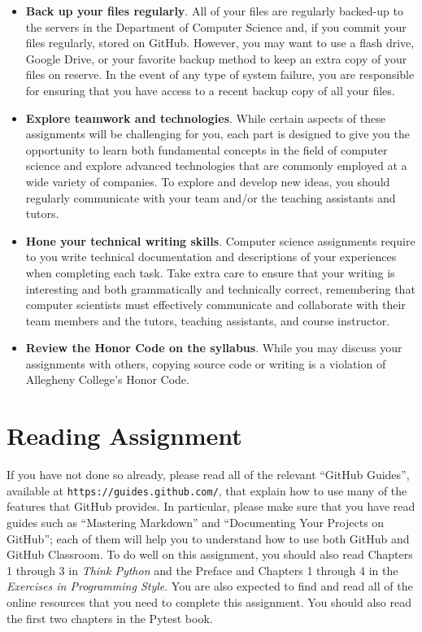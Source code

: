 \documentclass[11pt]{article}
\newcommand{\url}[1]{\lstinline{#1}}
\begin{document}
\begin{itemize}
\item {\bf Back up your files regularly}. All of your files are regularly
  backed-up to the servers in the Department of Computer Science and, if you
  commit your files regularly, stored on GitHub. However, you may want to use a
  flash drive, Google Drive, or your favorite backup method to keep an extra
  copy of your files on reserve. In the event of any type of system failure,
  you are responsible for ensuring that you have access to a recent backup copy
  of all your files.

\item {\bf Explore teamwork and technologies}. While certain aspects of these
  assignments will be challenging for you, each part is designed to give you the
  opportunity to learn both fundamental concepts in the field of computer
  science and explore advanced technologies that are commonly employed at a wide
  variety of companies. To explore and develop new ideas, you should regularly
  communicate with your team and/or the teaching assistants and tutors.

\item {\bf Hone your technical writing skills}. Computer science assignments
  require to you write technical documentation and descriptions of your
  experiences when completing each task. Take extra care to ensure that your
  writing is interesting and both grammatically and technically correct,
  remembering that computer scientists must effectively communicate and
  collaborate with their team members and the tutors, teaching assistants, and
  course instructor.

\item {\bf Review the Honor Code on the syllabus}. While you may discuss your
  assignments with others, copying source code or writing is a violation of
  Allegheny College's Honor Code.

\end{itemize}

\section*{Reading Assignment}

If you have not done so already, please read all of the relevant ``GitHub
Guides'', available at \url{https://guides.github.com/}, that explain how to
use many of the features that GitHub provides. In particular, please make sure
that you have read guides such as ``Mastering Markdown'' and ``Documenting Your
Projects on GitHub''; each of them will help you to understand how to use both
GitHub and GitHub Classroom. To do well on this assignment, you should also
read Chapters 1 through 3 in {\em Think Python\/} and the Preface and Chapters
1 through 4 in the {\em Exercises in Programming Style\/}.
%
You are also expected to find and read all of the online resources that you
need to complete this assignment.
%
You should also read the first two chapters in the Pytest book.
\end{document}
